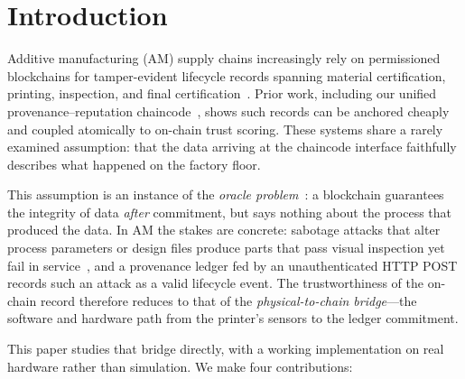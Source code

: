 \section{Introduction}
\label{sec:introduction}

Additive manufacturing (AM) supply chains increasingly rely on
permissioned blockchains for tamper-evident lifecycle records spanning
material certification, printing, inspection, and final
certification~\cite{alkhader2020blockchain, kurpjuweit2021blockchain}.
Prior work, including our unified provenance--reputation
chaincode~\cite{anonymous2026unified}, shows such records can be anchored
cheaply and coupled atomically to on-chain trust scoring.  These systems
share a rarely examined assumption: that the data arriving at the
chaincode interface faithfully describes what happened on the factory
floor.

This assumption is an instance of the \emph{oracle
problem}~\cite{caldarelli2020oracle}: a blockchain guarantees the integrity
of data \emph{after} commitment, but says nothing about the process that
produced the data.  In AM the stakes are concrete: sabotage attacks that
alter process parameters or design files produce parts that pass visual
inspection yet fail in service~\cite{belikovetsky2017dr0wned,
yampolskiy2018security}, and a provenance ledger fed by an unauthenticated
HTTP POST records such an attack as a valid lifecycle event.  The
trustworthiness of the on-chain record therefore reduces to that of the
\emph{physical-to-chain bridge}---the software and hardware path from the
printer's sensors to the ledger commitment.

This paper studies that bridge directly, with a working implementation on
real hardware rather than simulation.  We make four contributions:

